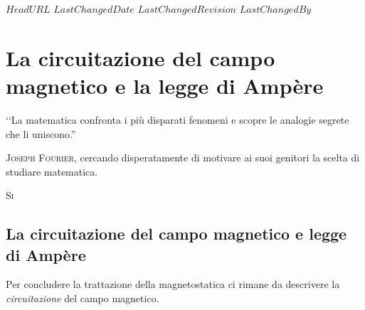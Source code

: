 \svnidlong
{$HeadURL$}
{$LastChangedDate$}
{$LastChangedRevision$}
{$LastChangedBy$}
\chapter{La circuitazione del campo magnetico e la legge di Ampère} %

\begin{introduction}
‘‘La matematica confronta i più disparati fenomeni e scopre le analogie segrete che li uniscono.''
\begin{flushright}
	\textsc{Joseph Fourier,} cercando disperatamente di motivare ai suoi genitori la scelta di studiare matematica. %
\end{flushright}
\end{introduction}
\lettrine[findent=1pt, nindent=0pt]{S}{i} %

\section{La circuitazione del campo magnetico e legge di Ampère}
Per concludere la trattazione della magnetostatica ci rimane da descrivere la \textit{circuitazione} del campo magnetico.
